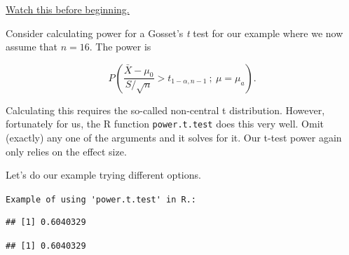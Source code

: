 \documentclass[]{article}
\newenvironment{Shaded}{\begin{snugshade}}{\end{snugshade}}
\newcommand{\KeywordTok}[1]{\textcolor[rgb]{0.13,0.29,0.53}{\textbf{{#1}}}}
\newcommand{\DataTypeTok}[1]{\textcolor[rgb]{0.13,0.29,0.53}{{#1}}}
\newcommand{\DecValTok}[1]{\textcolor[rgb]{0.00,0.00,0.81}{{#1}}}
\newcommand{\StringTok}[1]{\textcolor[rgb]{0.31,0.60,0.02}{{#1}}}
\newcommand{\CommentTok}[1]{\textcolor[rgb]{0.56,0.35,0.01}{\textit{{#1}}}}
\newcommand{\NormalTok}[1]{{#1}}
\begin{document}
\href{http://youtu.be/1DiwutNpt5Y?list=PLpl-gQkQivXiBmGyzLrUjzsblmQsLtkzJ}{Watch
this before beginning.}

Consider calculating power for a Gosset's \emph{t} test for our example
where we now assume that $n=16$. The power is

\[
P\left(\frac{\bar X - \mu_0}{S /\sqrt{n}} > t_{1-\alpha, n-1} ~;~ \mu = \mu_a \right).
\]

Calculating this requires the so-called non-central t distribution.
However, fortunately for us, the R function \texttt{power.t.test} does
this very well. Omit (exactly) any one of the arguments and it solves
for it. Our t-test power again only relies on the effect size.

Let's do our example trying different options.

\vspace{1pc}

\verb;Example of using 'power.t.test' in R.:;

\begin{Shaded}
\end{Shaded}

\begin{verbatim}
## [1] 0.6040329
\end{verbatim}

\begin{Shaded}
\end{Shaded}

\begin{verbatim}
## [1] 0.6040329
\end{verbatim}
\end{document}
